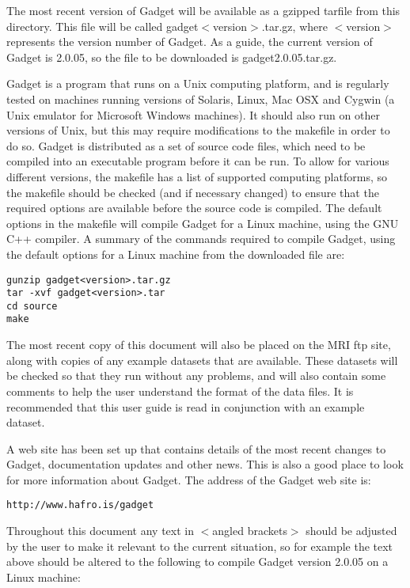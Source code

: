 \documentclass [a4paper, 10pt]{book}
\begin{document}
The most recent version of Gadget will be available as a gzipped tarfile from this directory.  This file will be called gadget$<$version$>$.tar.gz, where $<$version$>$ represents the version number of Gadget.  As a guide, the current version of Gadget is 2.0.05, so the file to be downloaded is gadget2.0.05.tar.gz.

\bigskip
Gadget is a program that runs on a Unix computing platform, and is regularly tested on machines running versions of Solaris, Linux, Mac OSX and Cygwin (a Unix emulator for Microsoft Windows machines).  It should also run on other versions of Unix, but this may require modifications to the makefile in order to do so.  Gadget is distributed as a set of source code files, which need to be compiled into an executable program before it can be run.  To allow for various different versions, the makefile has a list of supported computing platforms, so the makefile should be checked (and if necessary changed) to ensure that the required options are available before the source code is compiled.  The default options in the makefile will compile Gadget for a Linux machine, using the GNU C++ compiler.  A summary of the commands required to compile Gadget, using the default options for a Linux machine from the downloaded file are:

{\small\begin{verbatim}
gunzip gadget<version>.tar.gz
tar -xvf gadget<version>.tar
cd source
make
\end{verbatim}}

The most recent copy of this document will also be placed on the MRI ftp site, along with copies of any example datasets that are available.  These datasets will be checked so that they run without any problems, and will also contain some comments to help the user understand the format of the data files.  It is recommended that this user guide is read in conjunction with an example dataset.

\bigskip
A web site has been set up that contains details of the most recent changes to Gadget, documentation updates and other news.  This is also a good place to look for more information about Gadget.  The address of the Gadget web site is:

{\small\begin{verbatim}
http://www.hafro.is/gadget
\end{verbatim}}

Throughout this document any text in $<$angled brackets$>$ should be adjusted by the user to make it relevant to the current situation, so for example the text above should be altered to the following to compile Gadget version 2.0.05 on a Linux machine:
\end{document}
